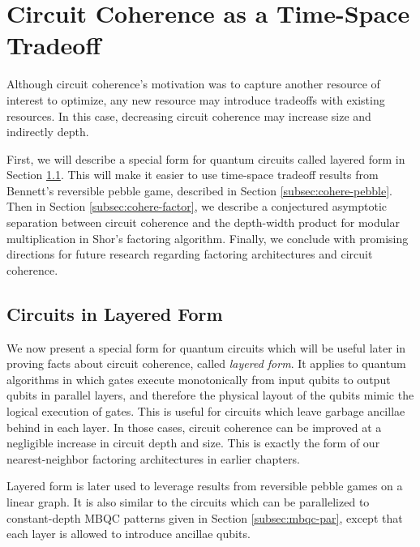 \section{Circuit Coherence as a Time-Space Tradeoff}
\label{sec:cohere-tradeoff}

Although circuit coherence's motivation was to capture another resource
of interest to optimize, any new resource may introduce tradeoffs with
existing resources. In this case, decreasing circuit coherence
may increase size and indirectly depth.

First, we will describe a special form for quantum circuits called
layered form in Section \ref{subsec:cohere-lqc}. This will make
it easier to use time-space tradeoff results from Bennett's
reversible pebble game, described in Section \ref{subsec:cohere-pebble}.
Then in Section \ref{subsec:cohere-factor}, we describe a conjectured asymptotic separation
between circuit coherence and the depth-width product for modular
multiplication in Shor's factoring algorithm. Finally, we conclude with
promising directions for future research regarding factoring architectures
and circuit coherence.

\subsection{Circuits in Layered Form}
\label{subsec:cohere-lqc}

We now present a special form for quantum circuits which will be useful
later in proving facts about circuit coherence, called \emph{layered form}.
It applies to quantum algorithms in which gates execute
monotonically from input qubits to output qubits in parallel layers,
and therefore the physical layout of the qubits mimic the logical
execution of gates. This is useful for circuits which leave
garbage ancillae behind in each layer. In those cases,
circuit coherence can be improved at a negligible increase
in circuit depth and size. This is exactly the form of our
nearest-neighbor factoring architectures in earlier chapters.

Layered form is later used to leverage
results from reversible pebble games on a linear graph. It is also
similar to the circuits which can be parallelized to
constant-depth
MBQC patterns given in Section \ref{subsec:mbqc-par}, except that
each layer is allowed to introduce ancillae qubits.

